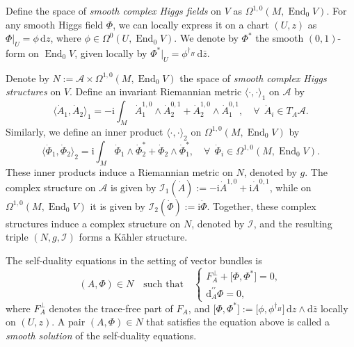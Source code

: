 \documentclass[a4paper]{amsart}
\theoremstyle{definition}
\theoremstyle{remark}
\numberwithin{equation}{section}
\begin{document}
Define the space of \textit{smooth complex Higgs fields} on $V$ as $\Omega^{1,0}(M, \operatorname{End}_0 V)$. For any smooth Higgs field $\Phi$, we can locally express it on a chart $(U, z)$ as $\Phi|_U = \phi \, \mathrm{d}z$, where $\phi \in \Omega^0(U, \operatorname{End}_0 V)$. We denote by $\Phi^*$ the smooth $(0,1)$-form on $\operatorname{End}_0 V$, given locally by $\Phi^*|_U = \phi^{\dagger_H} \, \mathrm{d}\bar{z}$.

Denote by $N := \mathscr{A} \times \Omega^{1,0}(M, \operatorname{End}_0 V)$ the space of \textit{smooth complex Higgs structures} on $V$. Define an invariant Riemannian metric $\langle \cdot, \cdot \rangle_1$ on $\mathscr{A}$ by  
\[
\langle \dot{A}_1, \dot{A}_2 \rangle_1 = -\mathrm{i} \int_M \dot{A}_1^{1,0} \wedge \dot{A}_2^{0,1} + \dot{A}_2^{1,0} \wedge \dot{A}_1^{0,1}, \quad \forall~~ \dot{A}_i \in T_A \mathscr{A}.
\]  
Similarly, we define an inner product $\langle \cdot, \cdot \rangle_2$ on $\Omega^{1,0}(M, \operatorname{End}_0 V)$ by  
\[
\langle \dot{\Phi}_1, \dot{\Phi}_2 \rangle_2 = \mathrm{i} \int_M \dot{\Phi}_1 \wedge \dot{\Phi}_2^* + \dot{\Phi}_2 \wedge \dot{\Phi}_1^*, \quad \forall~~ \dot{\Phi}_i \in \Omega^{1,0}(M, \operatorname{End}_0 V).
\]  
These inner products induce a Riemannian metric on $N$, denoted by $g$. 
The complex structure on $\mathscr{A}$ is given by $\mathcal{I}_1(\dot{A}) := -\mathrm{i} \dot{A}^{1,0} + \mathrm{i} \dot{A}^{0,1}$, while on $\Omega^{1,0}(M, \operatorname{End}_0 V)$ it is given by $\mathcal{I}_2(\dot{\Phi}) := \mathrm{i} \dot{\Phi}$. Together, these complex structures induce a complex structure on $N$, denoted by $\mathcal{I}$, and the resulting triple $(N, g, \mathcal{I})$ forms a Kähler structure. 

The self-duality equations in the setting of vector bundles is
\[
(A, \Phi) \in N \quad \text{such that} \quad
\begin{cases}
F_A^{\perp} + \big[\Phi, \Phi^*\big] = 0, \\
\mathrm{d}_A^{\prime\prime} \Phi = 0,
\end{cases}
\]
where $F_A^{\perp}$ denotes the trace-free part of $F_A$, and $\big[\Phi, \Phi^*\big] := \big[\phi, \phi^{\dagger_H}\big] \, \mathrm{d}z \wedge \mathrm{d}\bar{z}$ locally on $(U,z)$. A pair $(A, \Phi) \in N$ that satisfies the equation above is called a \textit{smooth solution} of the self-duality equations.
\end{document}
